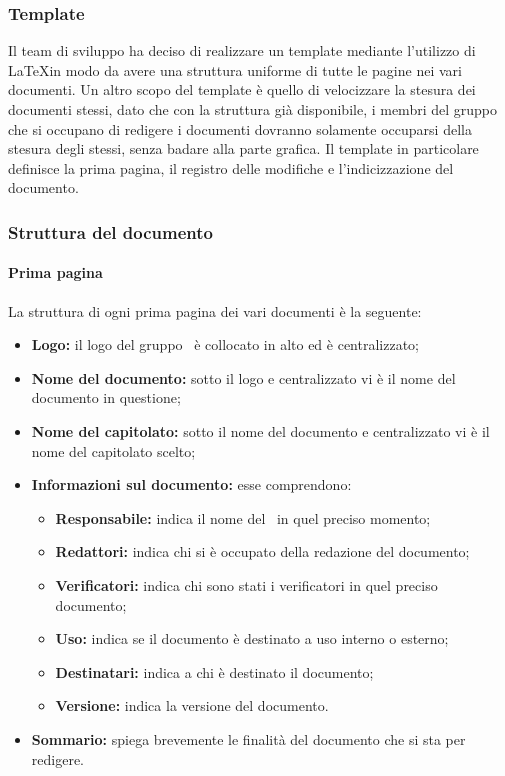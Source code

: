 \subsubsection{Template}
Il team di sviluppo ha deciso di realizzare un template mediante l'utilizzo di \LaTeX in modo da avere una struttura uniforme di tutte le pagine nei vari documenti.
Un altro scopo del template è quello di velocizzare la stesura dei documenti stessi, dato che con la struttura già disponibile, i membri del gruppo che si occupano di redigere i documenti dovranno solamente occuparsi della stesura degli stessi, senza badare alla parte grafica.
Il template in particolare definisce la prima pagina, il registro delle modifiche e l'indicizzazione del documento.
\subsubsection{Struttura del documento}
\paragraph{Prima pagina}
La struttura di ogni prima pagina dei vari documenti è la seguente:
\begin {itemize}
    \item \textbf{Logo:} il logo del gruppo \groupName\ è collocato in alto ed è centralizzato;
    \item \textbf{Nome del documento:} sotto il logo e centralizzato vi è il nome del documento in questione;
    \item \textbf{Nome del capitolato:} sotto il nome del documento e centralizzato vi è il nome del capitolato scelto;
    \item \textbf{Informazioni sul documento:} esse comprendono:
        \begin{itemize}
            \item \textbf{Responsabile:} indica il nome del \roleProjectManager\ in quel preciso momento;
            \item \textbf{Redattori:} indica chi si è occupato della redazione del documento;
            \item \textbf{Verificatori: }indica chi sono stati i verificatori in quel preciso documento;
            \item \textbf{Uso:} indica se il documento è destinato a uso interno o esterno;
            \item \textbf{Destinatari:} indica a chi è destinato il documento;
            \item \textbf{Versione:} indica la versione del documento. 
        \end{itemize}
    \item \textbf{Sommario:} spiega brevemente le finalità del documento che si sta per redigere.        
\end {itemize}

